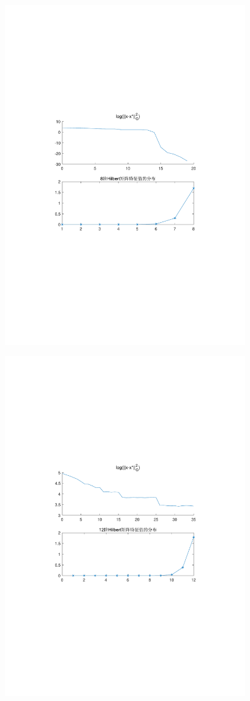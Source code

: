 \begin{figure}[H]
\centering
\includegraphics[width=10.5cm]{fig/5_2.pdf}
\end{figure}

\begin{figure}[H]
\centering
\includegraphics[width=10.5cm]{fig/5_3.pdf}%
\end{figure}

